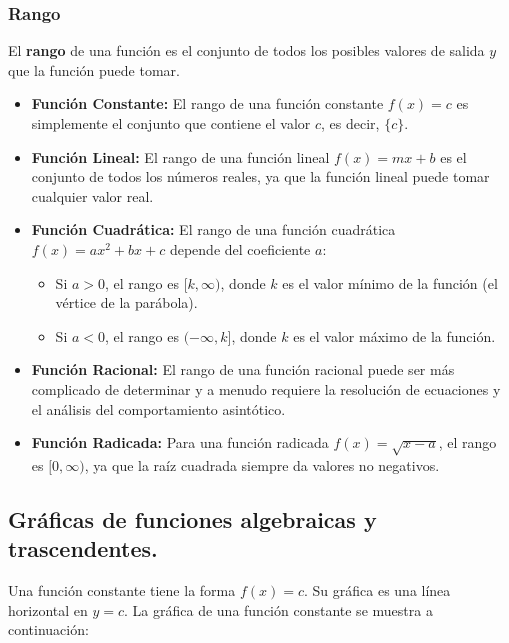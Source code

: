 \subsubsection{Rango}

El \textbf{rango} de una función es el conjunto de todos los posibles valores de salida \( y \) que la función puede tomar.

\begin{itemize}
    \item \textbf{Función Constante:} El rango de una función constante \( f(x) = c \) es simplemente el conjunto que contiene el valor \( c \), es decir, \(\{c\}\).

    \item \textbf{Función Lineal:} El rango de una función lineal \( f(x) = mx + b \) es el conjunto de todos los números reales, ya que la función lineal puede tomar cualquier valor real.

    \item \textbf{Función Cuadrática:} El rango de una función cuadrática \( f(x) = ax^2 + bx + c \) depende del coeficiente \( a \):
    \begin{itemize}
        \item Si \( a > 0 \), el rango es \([k, \infty)\), donde \( k \) es el valor mínimo de la función (el vértice de la parábola).
        \item Si \( a < 0 \), el rango es \((-\infty, k]\), donde \( k \) es el valor máximo de la función.
    \end{itemize}
    
    \item \textbf{Función Racional:} El rango de una función racional puede ser más complicado de determinar y a menudo requiere la resolución de ecuaciones y el análisis del comportamiento asintótico.

    \item \textbf{Función Radicada:} Para una función radicada \( f(x) = \sqrt{x - a} \), el rango es \([0, \infty)\), ya que la raíz cuadrada siempre da valores no negativos.
\end{itemize}



\subsection{Gráficas de funciones algebraicas y trascendentes.}

Una función constante tiene la forma \( f(x) = c \). Su gráfica es una línea horizontal en \( y = c \). La gráfica de una función constante se muestra a continuación:

